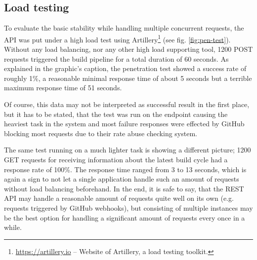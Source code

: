 \subsection{Load testing}
To evaluate the basic stability while handling multiple concurrent requests, the API was put under a high load test using Artillery\footnote{\url{https://artillery.io} -- Website of Artillery, a load testing toolkit.} (see fig. \ref{fig:pen-test}). Without any load balancing, nor any other high load supporting tool, 1200 POST requests triggered the build pipeline for a total duration of 60 seconds. As explained in the graphic's caption, the penetration test showed a success rate of roughly 1\%, a reasonable minimal response time of about 5 seconds but a terrible maximum response time of 51 seconds.

Of course, this data may not be interpreted as successful result in the first place, but it has to be stated, that the test was run on the endpoint causing the heaviest task in the system and most failure responses were effected by GitHub blocking most requests due to their rate abuse checking system.

The same test running on a much lighter task is showing a different picture; 1200 GET requests for receiving information about the latest build cycle had a response rate of 100\%. The response time ranged from 3 to 13 seconds, which is again a sign to not let a single application handle such an amount of requests without load balancing beforehand. In the end, it is safe to say, that the REST API may handle a reasonable amount of requests quite well on its own (e.g. requests triggered by GitHub webhooks), but consisting of multiple instances may be the best option for handling a significant amount of requests every once in a while.
